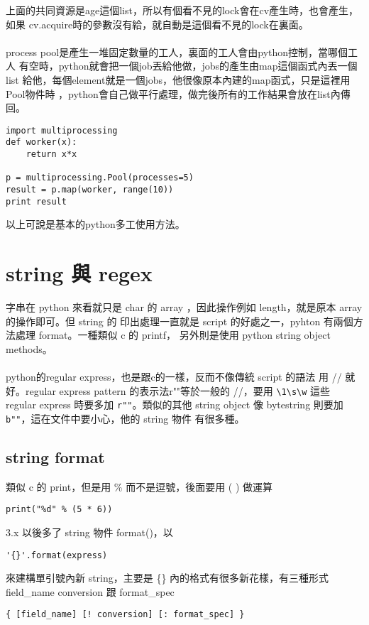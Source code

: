    上面的共同資源是age這個list，所以有個看不見的lock會在cv產生時，也會產生，如果
    cv.acquire時的參數沒有給，就自動是這個看不見的lock在裏面。
    \\\\
    process pool是產生一堆固定數量的工人，裏面的工人會由python控制，當哪個工人
    有空時，python就會把一個job丟給他做，jobs的產生由map這個函式內丟一個list
    給他，每個element就是一個jobs，他很像原本內建的map函式，只是這裡用Pool物件時
    ，python會自己做平行處理，做完後所有的工作結果會放在list內傳回。
    \begin{verbatim}
import multiprocessing
def worker(x):
    return x*x

p = multiprocessing.Pool(processes=5)
result = p.map(worker, range(10))
print result
    \end{verbatim}
    以上可說是基本的python多工使用方法。

\section{string 與 regex}
字串在 python 來看就只是 char 的 array ，因此操作例如 length，就是原本
array 的操作即可。但 string 的 印出處理一直就是 script 的好處之一，pyhton
有兩個方法處理 format。一種類似 c 的 printf， 另外則是使用 python string
object methods。
\\\\
python的regular express，也是跟c的一樣，反而不像傳統 script 的語法
用 // 就好。regular express pattern 的表示法r""等於一般的 //，要用
\verb=\1\s\w= 這些 regular express 時要多加 \verb=r""=。類似的其他 string
object 像 bytestring 則要加 \verb=b""=，這在文件中要小心，他的 string 物件
有很多種。

\subsection{string format}
類似 c 的 print，但是用 \% 而不是逗號，後面要用 ( ) 做運算
\begin{verbatim}
print("%d" % (5 * 6))
\end{verbatim}
3.x 以後多了 string 物件 format()，以
\begin{verbatim}
'{}'.format(express)
\end{verbatim}
來建構單引號內新 string，主要是 \{\} 內的格式有很多新花樣，有三種形式
field\_name conversion 跟 format\_spec
\begin{verbatim}
{ [field_name] [! conversion] [: format_spec] }
\end{verbatim}


